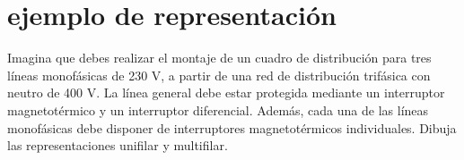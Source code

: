 \documentclass[spanish,openany]{report}
\date{\today}
\begin{document}

%
%
%




\section*{ejemplo de representación}
Imagina que debes realizar el montaje de un cuadro de distribución para tres líneas monofásicas de 230 V, a partir de una red de 
distribución trifásica con neutro de 400 V. La línea general debe estar protegida mediante un interruptor magnetotérmico y un
interruptor diferencial. Además, cada una de las líneas monofásicas debe disponer de interruptores magnetotérmicos individuales. 
Dibuja las representaciones unifilar y multifilar.
\end{document}
